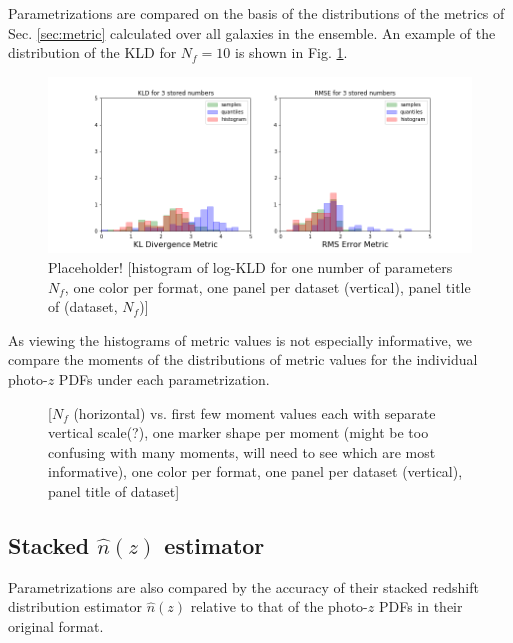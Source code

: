 \documentclass[\docopts]{\docclass}
\newcommand{\pz}{photo-$z$ PDF}
\begin{document}
Parametrizations are compared on the basis of the distributions of the metrics 
of Sec. \ref{sec:metric} calculated over all galaxies in the ensemble.  An 
example of the distribution of the KLD for $N_{f}=10$ is shown in Fig. 
\ref{fig:individual}.

\begin{figure}
  \includegraphics[width=0.9\columnwidth]{figures/individual_placeholder.png}
  \caption{Placeholder! [histogram of log-KLD for one number of parameters 
$N_{f}$, one color per format, one panel per dataset (vertical), panel title of 
(dataset, $N_{f}$)]
  \label{fig:individual}}
\end{figure}

As viewing the histograms of metric values is not especially informative, we 
compare the moments of the distributions of metric values for the individual 
\pz s under each parametrization.

\begin{figure}
  \caption{ [$N_{f}$ (horizontal) vs. first few 
moment values each with separate vertical scale(?), one marker shape per moment 
(might be too confusing with many moments, will need to see which are most 
informative), one color per format, one panel per dataset (vertical), panel 
title of dataset]
  \label{fig:moments}}
\end{figure}


\subsection{Stacked $\hat{n}(z)$ estimator}
\label{sec:stacked}

Parametrizations are also compared by the accuracy of their stacked redshift 
distribution estimator $\hat{n}(z)$ relative to that of the \pz s in their 
original format.
\end{document}
